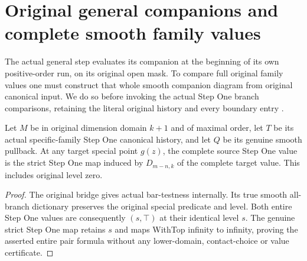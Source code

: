 \section{Original general companions and complete smooth family values}

The actual general step evaluates its companion at the beginning of its
own positive-order run, on its original open mask.  To compare full original
family values one must construct that whole smooth companion diagram from
original canonical input.  We do so before invoking the actual Step One
branch comparisons, retaining the literal original history and every boundary
entry \cite{wlodarczyk05-hironaka,bierstone-milman08-functoriality}.

\begin{theorem}
\label{hir:smooth-original-special-step-one-value}
\leanok
{}
Let $M$ be in original dimension domain $k+1$ and of maximal order, let
$T$ be its actual specific-family Step One canonical history, and let $Q$
be its genuine smooth pullback.  At any target special point $g(z)$,
the complete source Step One value is the strict Step One map induced by
$D_{m-n,k}$ of the complete target value.  This includes original level zero.
\end{theorem}
\begin{proof}
The original bridge gives actual bar-testness internally.  Its true smooth
all-branch dictionary preserves the original special predicate and level.
Both entire Step One values are consequently $(s,\top)$ at their identical
level $s$.  The genuine strict Step One map retains $s$ and maps WithTop
infinity to infinity, proving the asserted entire pair formula without
any lower-domain, contact-choice or value certificate.
\end{proof}

